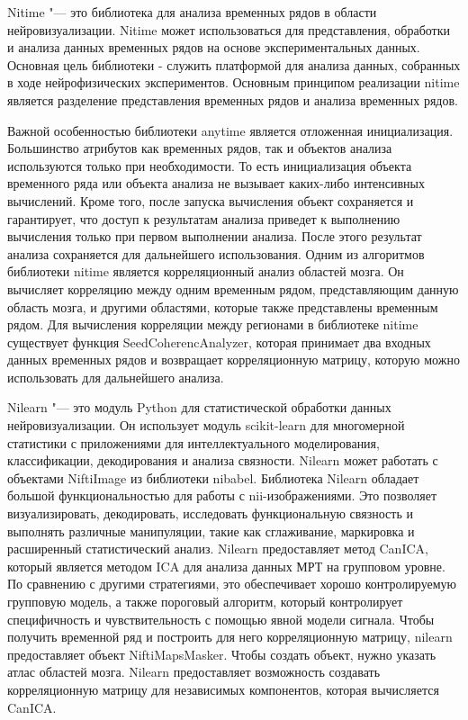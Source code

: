 Nitime \cite{rokem2009nitime} "--- это библиотека для анализа временных рядов в области нейровизуализации. 
Nitime может использоваться для представления, обработки и анализа данных временных рядов на основе экспериментальных 
данных. Основная цель библиотеки - служить платформой для анализа данных, собранных в ходе нейрофизических 
экспериментов. Основным принципом реализации nitime является разделение представления временных рядов и 
анализа временных рядов.

Важной особенностью библиотеки anytime является отложенная инициализация. Большинство атрибутов как временных 
рядов, так и объектов анализа используются только при необходимости. То есть инициализация объекта временного 
ряда или объекта анализа не вызывает каких-либо интенсивных вычислений. Кроме того, после запуска вычисления 
объект сохраняется и гарантирует, что доступ к результатам анализа приведет к выполнению вычисления только при 
первом выполнении анализа. После этого результат анализа сохраняется для дальнейшего использования. Одним из 
алгоритмов библиотеки nitime является корреляционный анализ областей мозга. Он вычисляет корреляцию между одним 
временным рядом, представляющим данную область мозга, и другими областями, которые также представлены временным 
рядом. Для вычисления корреляции между регионами в библиотеке nitime существует функция SeedCoherencAnalyzer, 
которая принимает два входных данных временных рядов и возвращает корреляционную матрицу, которую можно 
использовать для дальнейшего анализа.

Nilearn \cite{abraham2014machine} "--- это модуль Python для статистической обработки данных нейровизуализации.
Он использует модуль scikit-learn для многомерной статистики с приложениями для интеллектуального моделирования, 
классификации, декодирования и анализа связности. Nilearn может работать с объектами NiftiImage из библиотеки nibabel.
Библиотека Nilearn обладает большой функциональностью для работы с nii-изображениями. Это позволяет визуализировать, 
декодировать, исследовать функциональную связность и выполнять различные манипуляции, такие как сглаживание, 
маркировка и расширенный статистический анализ.
Nilearn предоставляет метод CanICA, который является методом ICA для анализа данных МРТ на групповом уровне. 
По сравнению с другими стратегиями, это обеспечивает хорошо контролируемую групповую модель, а также пороговый 
алгоритм, который контролирует специфичность и чувствительность с помощью явной модели сигнала. 
Чтобы получить временной ряд и построить для него корреляционную матрицу, nilearn предоставляет объект NiftiMapsMasker. 
Чтобы создать объект, нужно указать атлас областей мозга. Nilearn предоставляет возможность создавать корреляционную 
матрицу для независимых компонентов, которая вычисляется CanICA.

